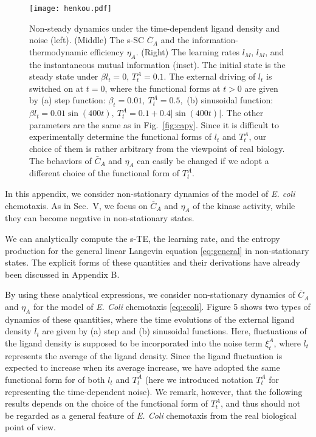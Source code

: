 \documentclass[%
 reprint,
 amsmath,amssymb,
 aps,
]{revtex4-1}
\theoremstyle{plain}
\begin{document}
\begin{figure*}[htbp]
\begin{center}
\texttt{[image: henkou.pdf]} %
\end{center}
\caption{\label{fig:graph}Non-steady dynamics under the time-dependent ligand density and noise (left).  (Middle) The s-SC $\overline{C}_A$ and the information-thermodynamic efficiency $\eta_A$. (Right) The learning rates $l_M$, $l_M$, and the instantaneous mutual information (inset). The initial state is the steady state under $\beta l_t=0$, $T_t^A=0.1$. The external driving of $l_t$ is switched on at $t=0$, where the functional forms at $t>0$ are given by (a) step function: $\beta_t=0.01,\ T_t^A=0.5,$ (b) sinusoidal function: $\beta l_t=0.01\sin(400t),\ T_t^A=0.1+0.4|\sin(400t)|$. The other parameters are the same as in Fig.~\ref{fig:capy}. Since it is difficult to experimentally determine the functional forms of $l_t$ and $T_t^A$, our choice of them is rather arbitrary from the viewpoint of real biology.  The behaviors of $\bar{C}_A$ and $\eta_A$ can easily be changed if we adopt a different choice of the functional form of $T_t^A$.}
\end{figure*}
In this appendix, we consider non-stationary dynamics of the model of {\it E. coli} chemotaxis. As in Sec.~V, we focus on $\overline{C}_A$ and $\eta_A$ of the kinase activity, while 
they can become negative in non-stationary states.

We can analytically compute the s-TE, the learning rate, and the entropy production for the general linear Langevin equation \eqref{eq:general} in non-stationary states. The explicit forms of these quantities and their derivations have already been discussed in Appendix B.

By using these analytical expressions,  we consider non-stationary dynamics of $\overline{C}_A$ and $\eta_A$ for the model of {\it E. Coli} chemotaxis \eqref{eq:ecoli}. Figure 5 shows two types of dynamics of these quantities, where the time evolutions of the external ligand density $l_t$ are given by (a) step and (b) sinusoidal functions. Here, fluctuations of the ligand density is supposed to be incorporated into the noise term $\xi_t^A$, where $l_t$ represents the average of the ligand density.   Since the ligand fluctuation is expected to increase when its average increase, we have adopted the same functional form for of both $l_t$ and $T_t^A$ (here we introduced notation $T_t^A$ for representing the time-dependent noise). We remark, however, that the following results depends on the choice of the functional form of $T_t^A$, and thus should not be regarded as a general feature of {\it E. Coli} chemotaxis from the real biological point of view.
\end{document}
